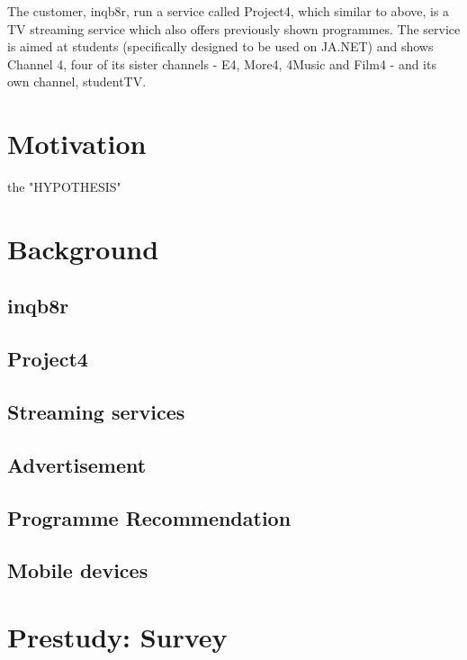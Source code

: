 \documentclass[12pt,a4paper,twoside, titlepage, openright, cleardoublepage=empty]{article}
\begin{document}
The customer, inqb8r, run a service called Project4, which similar to above, is a TV streaming service which also offers previously shown programmes. The service is aimed at students (specifically designed to be used on JA.NET) and shows Channel 4, four of its sister channels - E4, More4, 4Music and Film4 - and its own channel, studentTV.

\cleardoublepage


\section{Motivation}

the "HYPOTHESIS"

\section{Background}

\subsection{inqb8r}

\subsection{Project4}

\subsection{Streaming services}

\subsection{Advertisement}

\subsection{Programme Recommendation}

\subsection{Mobile devices}

\cleardoublepage

\section{Prestudy: Survey}
\end{document}
